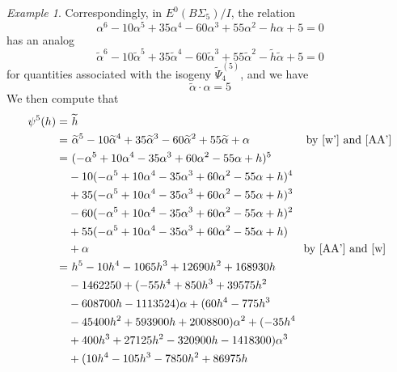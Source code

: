\documentclass{gtpart}
\theoremstyle{definition}
\theoremstyle{remark}
\newtheorem{ex}[thm]{Example}
\newcommand{\A}{\alpha}
\renewcommand{\=}{\approx}
\renewcommand{\-}{\sim}
\numberwithin{equation}{section}
\numberwithin{thm}{section}
\begin{document}
\begin{ex}
 Correspondingly, in $E^0(B\Sigma_5) / I$, the relation 
 \begin{equation}
  \label{w}
  \A^6 - 10 \A^5 + 35 \A^4 - 60 \A^3 + 55 \A^2 - h \A + 5 = 0 
 \end{equation}
 has an analog 
 \begin{equation}
  \label{w'}
  \widetilde{\A}^6 - 10 \widetilde{\A}^5 + 35 \widetilde{\A}^4 
  - 60 \widetilde{\A}^3 + 55 \widetilde{\A}^2 - \widetilde{h} \widetilde{\A} + 5 
  = 0 
 \end{equation}
 for quantities associated with the isogeny $\widetilde{\Psi}_4^{(5)}$, and we 
 have 
 \begin{equation}
  \label{AA'}
  \widetilde{\A} \cdot \A = 5 
 \end{equation}
 We then compute that 
 \begin{equation}
  \label{psi5}
  \begin{split}
   \psi^5(h) = & ~ \widetilde{h} \\
             = & ~ \widetilde{\A}^5 - 10 \widetilde{\A}^4 + 35 \widetilde{\A}^3 
                 - 60 \widetilde{\A}^2 + 55 \widetilde{\A} + \A 
                 \qquad\qquad\quad \text{by \eqref{w'} and \eqref{AA'}} \\
             = & ~ (-\A^5 + 10 \A^4 - 35 \A^3 + 60 \A^2 - 55 \A + h)^5 \\
               & - 10 (-\A^5 + 10 \A^4 - 35 \A^3 + 60 \A^2 - 55 \A + h)^4 \\
               & + 35 (-\A^5 + 10 \A^4 - 35 \A^3 + 60 \A^2 - 55 \A + h)^3 \\
               & - 60 (-\A^5 + 10 \A^4 - 35 \A^3 + 60 \A^2 - 55 \A + h)^2 \\
               & + 55 (-\A^5 + 10 \A^4 - 35 \A^3 + 60 \A^2 - 55 \A + h) \\
               & + \A 
                 \qquad\qquad\qquad\qquad\qquad\qquad\qquad\qquad\qquad\quad 
                 \text{by \eqref{AA'} and \eqref{w}} \\
             = & ~ h^5 - 10 h^4 - 1065 h^3 + 12690 h^2 + 168930 h \\
               & - 1462250 + (-55 h^4 + 850 h^3 + 39575 h^2 \\
               & - 608700 h - 1113524) \A + (60 h^4 - 775 h^3 \\
               & - 45400 h^2 + 593900 h + 2008800) \A^2 + (-35 h^4 \\
               & + 400 h^3 + 27125 h^2 - 320900 h - 1418300) \A^3 \\
               & + (10 h^4 - 105 h^3 - 7850 h^2 + 86975 h \\

\end{split}
\end{equation}
\end{ex}
\end{document}
